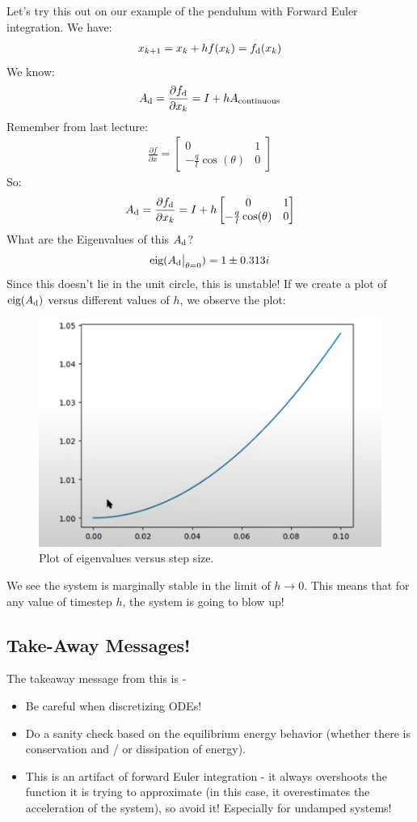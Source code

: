 \noindent
Let's try this out on our example of the pendulum with Forward Euler integration. 
We have: 
\begin{align}
    x_{k+1} = x_{k} + h f(x_k) = f_{\rm d} (x_k)
\end{align}
We know: 
\begin{align}
    A_{\rm d} = \frac{\partial f_{\rm d}}{\partial x_k} = I + h A_{\rm continuous}
\end{align}
Remember from last lecture: 
\begin{align}
    \frac{\partial f}{\partial x} = \begin{bmatrix}
        0 & 1 \\
        - \frac{q}{l} \cos(\theta) & 0
    \end{bmatrix}
\end{align}
So: 
\begin{align}
    A_{\rm d} = \frac{\partial f_{\rm d}}{\partial x_k} = I + h \begin{bmatrix}
        0 & 1 \\
        - \frac{q}{l} \cos(\theta) & 0
    \end{bmatrix}
\end{align}
What are the Eigenvalues of this $A_{\rm d}$? 
\begin{align}
    \textrm{eig} ( \evalat{A_{\rm d}}{\theta=0} ) = 1 \pm 0.313 i
\end{align}
Since this doesn't lie in the unit circle, this is unstable! 
If we create a plot of $\textrm{eig}(A_{\rm d})$ versus different values of $h$, we observe the plot: 
\begin{figure}
    \centering
    \includegraphics[width=0.4\linewidth]{L2_Images/L2_plot.PNG}
    \caption{Plot of eigenvalues versus step size.}
    \label{fig:l2f1}
\end{figure}
We see the system is marginally stable in the limit of $h \rightarrow 0$. This means that for any value of timestep $h$, the system is going to blow up!

\subsection{Take-Away Messages!}
The takeaway message from this is - 
\begin{itemize}
    \item Be careful when discretizing ODEs!
    \item Do a sanity check based on the equilibrium energy behavior (whether there is conservation and / or dissipation of energy). 
    \item This is an artifact of forward Euler integration - it always overshoots the function it is trying to approximate (in this case, it overestimates the acceleration of the system), so avoid it!
    Especially for undamped systems! 
\end{itemize}

